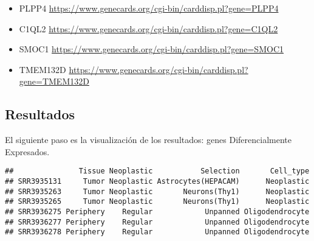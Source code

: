 \documentclass[
]{article}
\newenvironment{Shaded}{\begin{snugshade}}{\end{snugshade}}
\newcommand{\CommentTok}[1]{\textcolor[rgb]{0.56,0.35,0.01}{\textit{#1}}}
\newcommand{\DecValTok}[1]{\textcolor[rgb]{0.00,0.00,0.81}{#1}}
\newcommand{\FunctionTok}[1]{\textcolor[rgb]{0.00,0.00,0.00}{#1}}
\newcommand{\NormalTok}[1]{#1}
\newcommand{\OtherTok}[1]{\textcolor[rgb]{0.56,0.35,0.01}{#1}}
\newcommand{\SpecialCharTok}[1]{\textcolor[rgb]{0.00,0.00,0.00}{#1}}
\newcommand{\StringTok}[1]{\textcolor[rgb]{0.31,0.60,0.02}{#1}}
\providecommand{\tightlist}{%
  \setlength{\itemsep}{0pt}\setlength{\parskip}{0pt}}
\begin{document}
\begin{itemize}
\tightlist
\item
  PLPP4 \url{https://www.genecards.org/cgi-bin/carddisp.pl?gene=PLPP4}
\item
  C1QL2 \url{https://www.genecards.org/cgi-bin/carddisp.pl?gene=C1QL2}
\item
  SMOC1 \url{https://www.genecards.org/cgi-bin/carddisp.pl?gene=SMOC1}
\item
  TMEM132D
  \url{https://www.genecards.org/cgi-bin/carddisp.pl?gene=TMEM132D}
\end{itemize}

\hypertarget{resultados}{%
\subsection{Resultados}\label{resultados}}

El siguiente paso es la visualización de los resultados: genes
Diferencialmente Expresados.

\begin{Shaded}
\end{Shaded}

\begin{verbatim}
##               Tissue Neoplastic           Selection       Cell_type
## SRR3935131     Tumor Neoplastic Astrocytes(HEPACAM)      Neoplastic
## SRR3935263     Tumor Neoplastic       Neurons(Thy1)      Neoplastic
## SRR3935265     Tumor Neoplastic       Neurons(Thy1)      Neoplastic
## SRR3936275 Periphery    Regular            Unpanned Oligodendrocyte
## SRR3936277 Periphery    Regular            Unpanned Oligodendrocyte
## SRR3936278 Periphery    Regular            Unpanned Oligodendrocyte
\end{verbatim}
\end{document}
